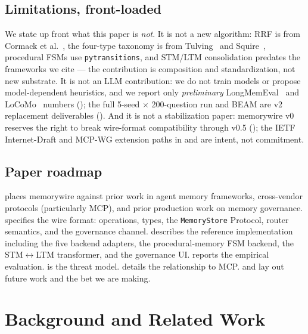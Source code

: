 \documentclass[11pt,letterpaper,twocolumn]{article}
\begin{document}
\subsection{Limitations, front-loaded}
\label{sec:intro-limitations}

We state up front what this paper is \emph{not}. It is not a new algorithm: RRF is from Cormack et al.~\cite{cormack2009rrf}, the four-type taxonomy is from Tulving~\cite{tulving1972episodic} and Squire~\cite{squire1992declarative}, procedural FSMs use \texttt{pytransitions}, and STM/LTM consolidation predates the frameworks we cite --- the contribution is composition and standardization, not new substrate. It is not an LLM contribution: we do not train models or propose model-dependent heuristics, and we report only \emph{preliminary} LongMemEval~\cite{wu2024longmemeval} and LoCoMo~\cite{maharana2024locomo} numbers (); the full 5-seed $\times$ 200-question run and BEAM are v2 replacement deliverables (). And it is not a stabilization paper: memorywire v0 reserves the right to break wire-format compatibility through v0.5 (); the IETF Internet-Draft and MCP-WG extension paths in  and  are intent, not commitment.

\subsection{Paper roadmap}
\label{sec:intro-roadmap}

 places memorywire against prior work in agent memory frameworks, cross-vendor protocols (particularly MCP), and prior production work on memory governance.  specifies the wire format: operations, types, the \texttt{MemoryStore} Protocol, router semantics, and the governance channel.  describes the reference implementation including the five backend adapters, the procedural-memory FSM backend, the STM$\leftrightarrow$LTM transformer, and the governance UI.  reports the empirical evaluation.  is the threat model.  details the relationship to MCP.  and  lay out future work and the bet we are making.

\section{Background and Related Work}
\label{sec:related}
\end{document}
